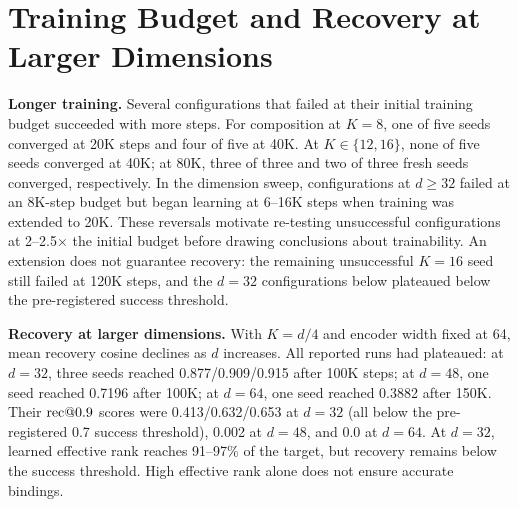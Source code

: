 \section{Training Budget and Recovery at Larger Dimensions}
\label{sec:frontier}

\textbf{Longer training.} Several configurations that failed at their
initial training budget succeeded with more steps. For composition
at $K{=}8$, one of five seeds converged at 20K steps and four of five
at 40K.
At $K \in \{12, 16\}$, none of five seeds converged at 40K; at 80K,
three of three and two of three fresh seeds converged, respectively.
In the dimension sweep, configurations at $d \geq 32$ failed at an
8K-step budget but began learning at 6--16K steps when training was
extended to 20K.
These reversals motivate re-testing unsuccessful configurations at
2--2.5$\times$ the initial budget before drawing conclusions about
trainability.
An extension does not guarantee recovery: the remaining unsuccessful
$K{=}16$ seed still failed at 120K steps,
and the $d{=}32$ configurations below plateaued below the
pre-registered success threshold.

\textbf{Recovery at larger dimensions.} With $K = d/4$ and encoder
width fixed at 64, mean recovery cosine declines as $d$ increases.
All reported runs had plateaued: at $d{=}32$, three seeds reached
0.877/0.909/0.915 after 100K steps; at $d{=}48$, one seed reached
0.7196 after 100K; at $d{=}64$, one seed reached 0.3882 after 150K.
Their $\mathrm{rec}@0.9$ scores were 0.413/0.632/0.653 at $d{=}32$
(all below the pre-registered 0.7 success threshold), 0.002 at
$d{=}48$, and 0.0 at $d{=}64$.
At $d{=}32$, learned effective rank reaches 91--97\% of the target,
but recovery remains below the success threshold. High effective rank
alone does not ensure accurate bindings.

